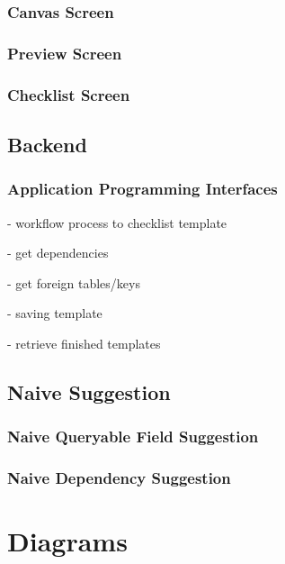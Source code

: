 \subsubsection{Canvas Screen}

\subsubsection{Preview Screen}

\subsubsection{Checklist Screen}

\subsection{Backend}

\subsubsection{Application Programming Interfaces}
- workflow process to checklist template

- get dependencies

- get foreign tables/keys

- saving template

- retrieve finished templates


\subsection{Naive Suggestion}
\subsubsection{Naive Queryable Field Suggestion}
\subsubsection{Naive Dependency Suggestion}

\section{Diagrams}
